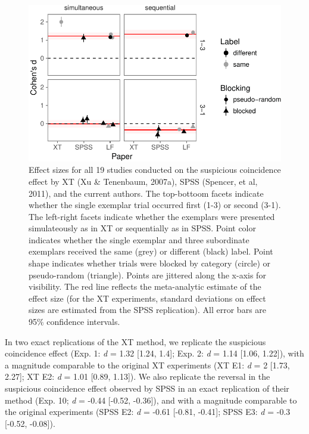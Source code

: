 \documentclass[english,floatsintext,man]{apa6}
\newcounter{author}
\theoremstyle{definition}
\theoremstyle{definition}
\theoremstyle{remark}
\begin{document}
\begin{figure}[htbp]
\centering
\includegraphics{xtmem_files/figure-latex/unnamed-chunk-4-1.pdf}
\caption{\label{fig:unnamed-chunk-4}Effect sizes for all 19 studies
conducted on the suspicious coincidence effect by XT (Xu \& Tenenbaum,
2007a), SPSS (Spencer, et al, 2011), and the current authors. The
top-bottoom facets indicate whether the single exemplar trial occurred
first (1-3) or second (3-1). The left-right facets indicate whether the
exemplars were presented simulateously as in XT or sequentially as in
SPSS. Point color indicates whether the single exemplar and three
subordinate exemplars received the same (grey) or different (black)
label. Point shape indicates whether trials were blocked by category
(circle) or pseudo-random (triangle). Points are jittered along the
x-axis for visibility. The red line reflects the meta-analytic estimate
of the effect size (for the XT experiments, standard deviations on
effect sizes are estimated from the SPSS replication). All error bars
are 95\% confidence intervals.}
\end{figure}

In two exact replications of the XT method, we replicate the suspicious
coincidence effect (Exp. 1: \emph{d} = 1.32 {[}1.24, 1.4{]}; Exp. 2:
\emph{d} = 1.14 {[}1.06, 1.22{]}), with a magnitude comparable to the
original XT experiments (XT E1: \emph{d} = 2 {[}1.73, 2.27{]}; XT E2:
\emph{d} = 1.01 {[}0.89, 1.13{]}). We also replicate the reversal in the
suspicious coincidence effect observed by SPSS in an exact replication
of their method (Exp. 10; \emph{d} = -0.44 {[}-0.52, -0.36{]}), and with
a magnitude comparable to the original experiments (SPSS E2: \emph{d} =
-0.61 {[}-0.81, -0.41{]}; SPSS E3: \emph{d} = -0.3 {[}-0.52, -0.08{]}).
\end{document}
